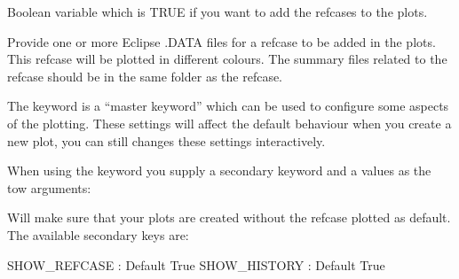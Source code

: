 \documentclass[a4paper,10pt,english]{sphinxmanual}
\begin{document}
\label{\detokenize{keywords/index:plot-refcase}}
\begin{sphinxShadowBox}

Boolean variable which is TRUE if you want to add the refcases to the plots.


%
\begin{sphinxVerbatim}[commandchars=\\\{\}]
 
\end{sphinxVerbatim}
\end{sphinxShadowBox}

\begin{sphinxShadowBox}

Provide one or more Eclipse .DATA files for a refcase to be added in the
plots. This refcase will be plotted in different colours. The summary files
related to the refcase should be in the same folder as the refcase.


%
\begin{sphinxVerbatim}[commandchars=\\\{\}]
  
\end{sphinxVerbatim}
\end{sphinxShadowBox}
\label{\detokenize{keywords/index:plot-settings}}
\begin{sphinxShadowBox}

The  keyword is a “master keyword” which can be
used to configure some aspects of the plotting. These settings will
affect the default behaviour when you create a new plot, you can still
changes these settings interactively.

When using the  keyword you supply a secondary
keyword and a values as the tow arguments:

%
\begin{sphinxVerbatim}[commandchars=\\\{\}]
  
\end{sphinxVerbatim}

Will make sure that your plots are created without the refcase plotted
as default. The available secondary keys are:

SHOW\_REFCASE : Default True
SHOW\_HISTORY : Default True
\end{sphinxShadowBox}
\end{document}
